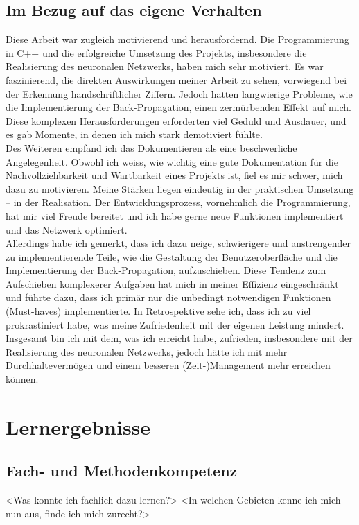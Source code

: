 \subsection{Im Bezug auf das eigene Verhalten}
Diese Arbeit war zugleich motivierend und herausfordernd. Die Programmierung in C++ und die erfolgreiche Umsetzung des Projekts, insbesondere die Realisierung des neuronalen Netzwerks, haben mich sehr motiviert. Es war faszinierend, die direkten Auswirkungen meiner Arbeit zu sehen, vorwiegend bei der Erkennung handschriftlicher Ziffern. Jedoch hatten langwierige Probleme, wie die Implementierung der Back-Propagation, einen zermürbenden Effekt auf mich. Diese komplexen Herausforderungen erforderten viel Geduld und Ausdauer, und es gab Momente, in denen ich mich stark demotiviert fühlte.
\\
Des Weiteren empfand ich das Dokumentieren als eine beschwerliche Angelegenheit. Obwohl ich weiss, wie wichtig eine gute Dokumentation für die Nachvollziehbarkeit und Wartbarkeit eines Projekts ist, fiel es mir schwer, mich dazu zu motivieren. Meine Stärken liegen eindeutig in der praktischen Umsetzung – in der Realisation. Der Entwicklungsprozess, vornehmlich die Programmierung, hat mir viel Freude bereitet und ich habe gerne neue Funktionen implementiert und das Netzwerk optimiert.
\\
Allerdings habe ich gemerkt, dass ich dazu neige, schwierigere und anstrengender zu implementierende Teile, wie die Gestaltung der Benutzeroberfläche und die Implementierung der Back-Propagation, aufzuschieben. Diese Tendenz zum Aufschieben komplexerer Aufgaben hat mich in meiner Effizienz eingeschränkt und führte dazu, dass ich primär nur die unbedingt notwendigen Funktionen (Must-haves) implementierte. In Retrospektive sehe ich, dass ich zu viel prokrastiniert habe, was meine Zufriedenheit mit der eigenen Leistung mindert.
\\
Insgesamt bin ich mit dem, was ich erreicht habe, zufrieden, insbesondere mit der Realisierung des neuronalen Netzwerks, jedoch hätte ich mit mehr Durchhaltevermögen und einem besseren (Zeit-)Management mehr erreichen können.


\section{Lernergebnisse}
\subsection{Fach- und Methodenkompetenz}
<Was konnte ich fachlich dazu lernen?>
<In welchen Gebieten kenne ich mich nun aus, finde ich mich zurecht?>
